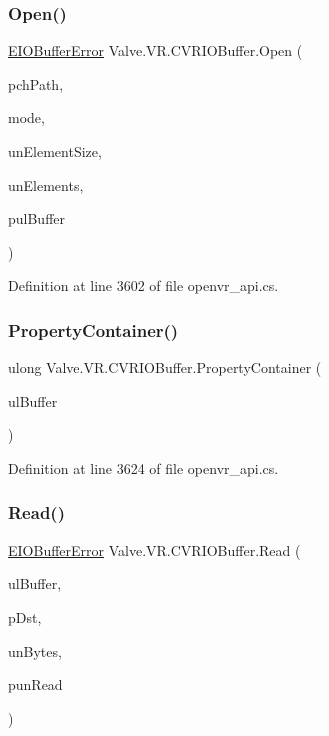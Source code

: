 \subsubsection{\texorpdfstring{Open()}{Open()}}
{\footnotesize\ttfamily \mbox{\hyperlink{namespace_valve_1_1_v_r_a11d6c73dbb80923b10779c007bb8c154}{E\+I\+O\+Buffer\+Error}} Valve.\+V\+R.\+C\+V\+R\+I\+O\+Buffer.\+Open (\begin{DoxyParamCaption}\item[{string}]{pch\+Path,  }\item[{\mbox{\hyperlink{namespace_valve_1_1_v_r_a59487dd6eb3684570995a3bea405db2e}{E\+I\+O\+Buffer\+Mode}}}]{mode,  }\item[{uint}]{un\+Element\+Size,  }\item[{uint}]{un\+Elements,  }\item[{ref ulong}]{pul\+Buffer }\end{DoxyParamCaption})}



Definition at line 3602 of file openvr\+\_\+api.\+cs.

\mbox{\label{class_valve_1_1_v_r_1_1_c_v_r_i_o_buffer_a859f0b4fe21ce5c8581b84ba59f3a0fe}} 
\subsubsection{\texorpdfstring{PropertyContainer()}{PropertyContainer()}}
{\footnotesize\ttfamily ulong Valve.\+V\+R.\+C\+V\+R\+I\+O\+Buffer.\+Property\+Container (\begin{DoxyParamCaption}\item[{ulong}]{ul\+Buffer }\end{DoxyParamCaption})}



Definition at line 3624 of file openvr\+\_\+api.\+cs.

\mbox{\label{class_valve_1_1_v_r_1_1_c_v_r_i_o_buffer_a852cd6742950d6f72fbe7e7a025d1c39}} 
\subsubsection{\texorpdfstring{Read()}{Read()}}
{\footnotesize\ttfamily \mbox{\hyperlink{namespace_valve_1_1_v_r_a11d6c73dbb80923b10779c007bb8c154}{E\+I\+O\+Buffer\+Error}} Valve.\+V\+R.\+C\+V\+R\+I\+O\+Buffer.\+Read (\begin{DoxyParamCaption}\item[{ulong}]{ul\+Buffer,  }\item[{Int\+Ptr}]{p\+Dst,  }\item[{uint}]{un\+Bytes,  }\item[{ref uint}]{pun\+Read }\end{DoxyParamCaption})}



